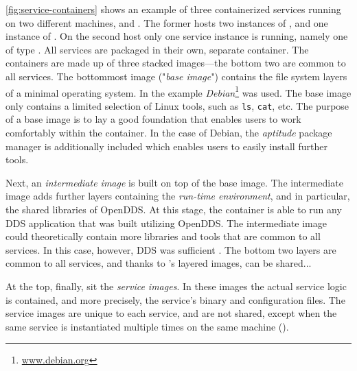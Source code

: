 \autoref{fig:service-containers} shows an example of three containerized services running on two different machines,  and . The former hosts two instances of , and one instance of . On the second host only one service instance is running, namely one of type . All services are packaged in their own, separate container. The containers are made up of three stacked images---the bottom two are common to all services. The bottommost image ("\emph{base image}") contains the file system layers of a minimal operating system. In the example  \emph{Debian}\footnote{\url{www.debian.org}} was used. The base image only contains a limited selection of Linux tools, such as \texttt{ls}, \texttt{cat}, etc. The purpose of a base image is to lay a good foundation that enables users to work comfortably within the container. In the case of Debian, the \emph{aptitude} package manager is additionally included which enables users to easily install further  tools. 

Next, an \emph{intermediate image} is built on top of the base image. The intermediate image adds further layers containing the \emph{run-time environment}, and in particular, the shared libraries of OpenDDS. At this stage, the container is able to run any DDS application that was built utilizing OpenDDS. The intermediate image could theoretically contain more libraries and tools that are common to all services. In this case, however, DDS was sufficient . The bottom two layers are common to all services, and thanks to \docker 's layered images, can be shared... 

At the top, finally, sit the \emph{service images}. In these images the actual service logic is contained, and more precisely, the service's binary and configuration files. The service images are unique to each service, and are not shared, except when the same service is instantiated multiple times on the same machine ().











